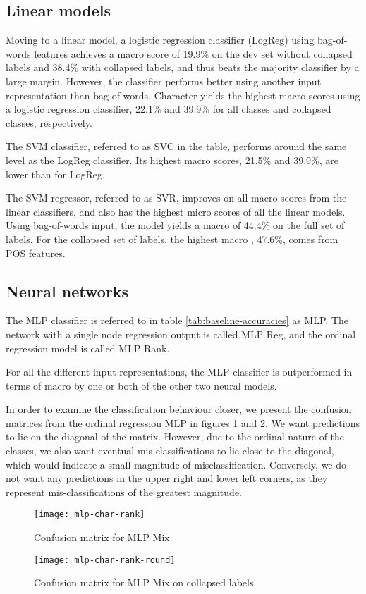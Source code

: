 \subsection{Linear models}

Moving to a linear model, a logistic regression classifier (LogReg) using
bag-of-words features achieves a macro \FI score of 19.9\% on the dev set
without collapsed labels and 38.4\% with collapsed labels, and thus beats the
majority classifier by a large margin. However, the classifier performs
better using another input representation than bag-of-words. Character
\ngrams yields the highest macro \FI scores using a logistic regression
classifier, 22.1\% and 39.9\% for all classes and collapsed classes,
respectively.

The \ac{SVM} classifier, referred to as SVC in the table, performs around the
same level as the LogReg classifier. Its highest macro \FI scores, 21.5\% and
39.9\%, are lower than for LogReg.

The \ac{SVM} regressor, referred to as SVR, improves on all macro \FI scores
from the linear classifiers, and also has the highest micro \FI scores of all
the linear models. Using bag-of-words input, the model yields a macro \FI of
44.4\% on the full set of labels. For the collapsed set of labels, the highest
macro \FI, 47.6\%, comes from POS \ngram features.


\subsection{Neural networks}

The \ac{MLP} classifier is referred to in table \ref{tab:baseline-accuracies}
as MLP. The network with a single node regression output is called MLP Reg,
and the ordinal regression model is called MLP Rank.

For all the different input representations, the \ac{MLP} classifier is
outperformed in terms of macro \FI by one or both of the other two neural
models.

In order to examine the classification behaviour closer, we present the
confusion matrices from the ordinal regression MLP in figures
\ref{fig:mlp-char-rank} and \ref{fig:mlp-char-rank-round}. We want
predictions to lie on the diagonal of the matrix. However, due to the ordinal
nature of the classes, we also want eventual mis-classifications to lie close
to the diagonal, which would indicate a small magnitude of misclassification.
Conversely, we do not want any predictions in the upper right and lower left
corners, as they represent mis-classifications of the greatest magnitude.

\begin{figure}
  \centering
  \texttt{[image: mlp-char-rank]}
  \caption{Confusion matrix for MLP Mix}
  \label{fig:mlp-char-rank}
\end{figure}

\begin{figure}
  \centering
  \texttt{[image: mlp-char-rank-round]}
  \caption{Confusion matrix for MLP Mix on collapsed labels}
  \label{fig:mlp-char-rank-round}
\end{figure}
